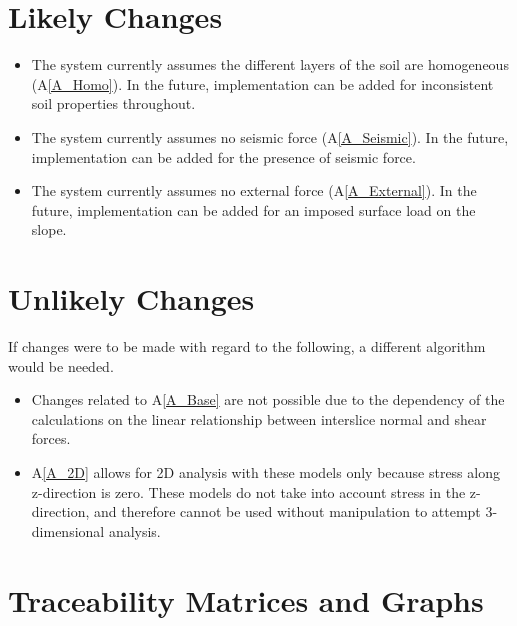 \documentclass[12pt]{article}
\newcommand{\aref}[1]{A\ref{#1}}
\newcounter{lcnum} %
\newcommand{\lthelcnum}{LC\thelcnum}
\newcounter{ucnum} %
\newcommand{\ltheucnum}{UC\theucnum}
\begin{document}
\section{Likely Changes}

\noindent \begin{itemize}
\item[\refstepcounter{lcnum}\lthelcnum \label{LC_inhomogeneous}:] The system 
currently assumes the different layers of the soil are homogeneous 
(\aref{A_Homo}). In the future, implementation can be added for inconsistent 
soil properties throughout.
 
\item[\refstepcounter{lcnum}\lthelcnum \label{LC_Seismic}:] The system 
currently assumes no seismic force (\aref{A_Seismic}). In the future, 
implementation can be added for the presence of seismic force.

\item[\refstepcounter{lcnum}\lthelcnum \label{LC_External}:] The system 
currently assumes no external force (\aref{A_External}).
In the future, implementation can be added for an imposed surface load on the 
slope.
\end{itemize}

\section{Unlikely Changes}
If changes were to be made with regard to the following,
a different algorithm would be needed.

\begin{itemize}
\item[\refstepcounter{ucnum}\ltheucnum \label{UC_insf}:] Changes related to 
\aref{A_Base} are not possible due to the dependency of the calculations on the 
linear relationship between interslice normal and shear forces.
\item[\refstepcounter{ucnum}\ltheucnum \label{UC_inhomogeneous}:] \aref{A_2D} 
allows for 2D analysis with these models only because stress along z-direction 
is zero. 
These models do not take into account stress in the z-direction, and therefore 
cannot be used without manipulation to attempt 3-dimensional analysis.
\end{itemize}


\section{Traceability Matrices and Graphs}
\end{document}
